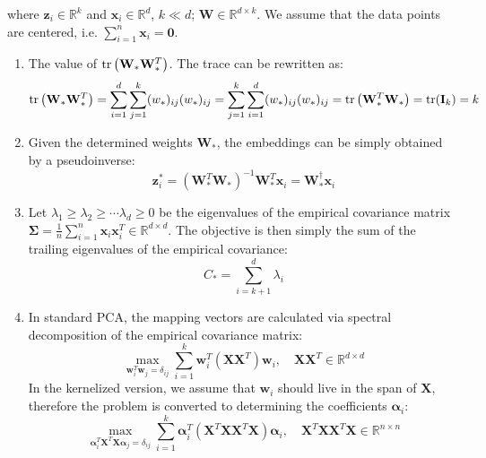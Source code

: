 \documentclass[a4paper, 10pt]{article}
\begin{document}
where $\mathbf{z}_i \in \mathbb{R}^k$ and $\mathbf{x}_i \in \mathbb{R}^d$, $k \ll d$; $\mathbf{W} \in \mathbb{R}^{d\times k}$. We assume that the data points are centered, i.e. $\sum_{i=1}^n \mathbf{x}_i = \mathbf{0}$.

\begin{enumerate}[label=(\alph*)]
    \item The value of ${\rm tr}\left(\mathbf{W}_* \mathbf{W}_*^T\right)$. The trace can be rewritten as:
    \begin{equation}
        {\rm tr}\left(\mathbf{W}_* \mathbf{W}_*^T\right) = \sum_{i=1}^d \sum_{j=1}^k (w_*)_{ij} (w_*)_{ij} = \sum_{j=1}^k \sum_{i=1}^d (w_*)_{ij} (w_*)_{ij} = {\rm tr}\left(\mathbf{W}_*^T \mathbf{W}_*\right) = {\rm tr}(\mathbf{I}_k) = k
    \end{equation}

    \item Given the determined weights $\mathbf{W}_*$, the embeddings can be simply obtained by a pseudoinverse:
    \begin{equation}
        \mathbf{z}_i^* = \left(\mathbf{W}_*^T \mathbf{W}_*\right)^{-1} \mathbf{W}_*^T \mathbf{x}_i = \mathbf{W}_*^\dagger \mathbf{x}_i
    \end{equation}

    \item Let $\lambda_1 \geq \lambda_2 \geq \cdots \lambda_d \geq 0$ be the eigenvalues of the empirical covariance matrix $\bm{\Sigma} = \frac{1}{n}\sum_{i=1}^n \mathbf{x}_i \mathbf{x}_i^T \in \mathbb{R}^{d\times d}$. The objective is then simply the sum of the trailing eigenvalues of the empirical covariance:
    \begin{equation}
        C_* = \sum_{i=k+1}^d \lambda_i
    \end{equation}

    \item In standard PCA, the mapping vectors are calculated via spectral decomposition of the empirical covariance matrix:
    \begin{equation}
        \max_{\mathbf{w}_i^T \mathbf{w}_j = \delta_{ij}} \sum_{i=1}^k \mathbf{w}_i^T \left(\mathbf{X}\mathbf{X}^T\right) \mathbf{w}_i, \quad \mathbf{X} \mathbf{X}^T \in \mathbb{R}^{d\times d}
    \end{equation}
    In the kernelized version, we assume that $\mathbf{w}_i$ should live in the span of $\mathbf{X}$, therefore the problem is converted to determining the coefficients $\bm{\alpha}_i$:
    \begin{equation}
        \max_{\bm{\alpha}_i^T \mathbf{X}^T \mathbf{X} \bm{\alpha}_j = \delta_{ij}} \sum_{i=1}^k \bm{\alpha}_i^T \left(\mathbf{X}^T \mathbf{X}\mathbf{X}^T \mathbf{X}\right) \bm{\alpha}_i, \quad \mathbf{X}^T \mathbf{X}\mathbf{X}^T \mathbf{X} \in \mathbb{R}^{n\times n}
    \end{equation}


\end{enumerate}
\end{document}
